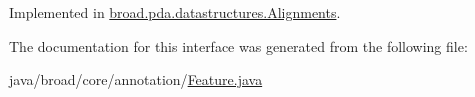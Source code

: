 Implemented in \hyperlink{classbroad_1_1pda_1_1datastructures_1_1_alignments_ad035b618294c2b18a553049446b814f5}{broad.\+pda.\+datastructures.\+Alignments}.



The documentation for this interface was generated from the following file\+:\begin{DoxyCompactItemize}
\item 
java/broad/core/annotation/\hyperlink{_feature_8java}{Feature.\+java}\end{DoxyCompactItemize}
